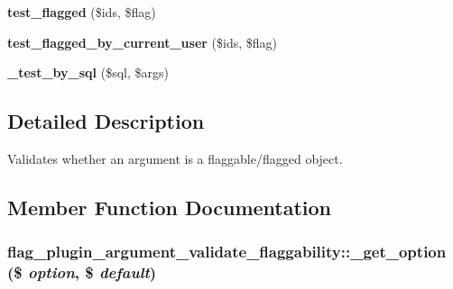 \begin{CompactItemize}
\item 
\hypertarget{classflag__plugin__argument__validate__flaggability_739ca2c56fb18425e1b871869fa284e6}{
\textbf{test\_\-flagged} (\$ids, \$flag)}
\label{classflag__plugin__argument__validate__flaggability_739ca2c56fb18425e1b871869fa284e6}

\item 
\hypertarget{classflag__plugin__argument__validate__flaggability_ab3ca9b95828c2715a2c3810745fc6ad}{
\textbf{test\_\-flagged\_\-by\_\-current\_\-user} (\$ids, \$flag)}
\label{classflag__plugin__argument__validate__flaggability_ab3ca9b95828c2715a2c3810745fc6ad}

\item 
\hypertarget{classflag__plugin__argument__validate__flaggability_7f51bd1b0ff2b58be0648ad15dc2bd95}{
\textbf{\_\-test\_\-by\_\-sql} (\$sql, \$args)}
\label{classflag__plugin__argument__validate__flaggability_7f51bd1b0ff2b58be0648ad15dc2bd95}

\end{CompactItemize}


\subsection{Detailed Description}
Validates whether an argument is a flaggable/flagged object. 

\subsection{Member Function Documentation}
\hypertarget{classflag__plugin__argument__validate__flaggability_add59b32c44ce29fd772d80641087e21}{
\subsubsection[{\_\-get\_\-option}]{\setlength{\rightskip}{0pt plus 5cm}flag\_\-plugin\_\-argument\_\-validate\_\-flaggability::\_\-get\_\-option (\$ {\em option}, \/  \$ {\em default})}}
\label{classflag__plugin__argument__validate__flaggability_add59b32c44ce29fd772d80641087e21}


